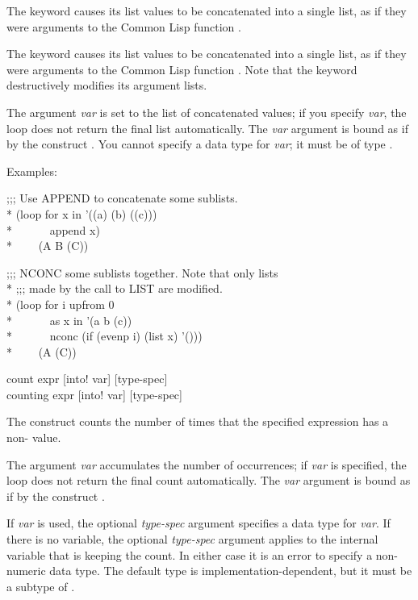\begin{new}
\begin{defloop}
The  keyword causes its list values to be concatenated 
into a single list, as if 
they were arguments to the Common Lisp function .

The  keyword causes its list values to be concatenated
into a single list,
as if they were arguments to the Common Lisp function .  
Note that the  keyword destructively modifies its argument lists.

The argument {\it var\/} is 
set to the list of concatenated values; if you specify {\it var}, the loop
does not return the final list automatically.  The {\it var\/} argument
is bound as if by the construct .
You cannot specify a data type for {\it var\/}; it must be of type .


Examples:
\begin{lisp}
;;; Use APPEND to concatenate some sublists. \\*
(loop for x in '((a) (b) ((c))) \\*
~~~~~~append x) \\*
~~~\EV~(A B (C))
\end{lisp}
\begin{lisp}
;;; NCONC some sublists together.  Note that only lists \\*
;;; made by the call to LIST are modified. \\*
(loop for i upfrom 0  \\*
~~~~~~as x in '(a b (c)) \\*
~~~~~~nconc (if (evenp i) (list x) '())) \\*
~~~\EV~(A (C))
\end{lisp}
\end{defloop}


\begin{defloop}
count expr [\!into! var] [type-spec] \\
counting expr [\!into! var] [type-spec]

The  construct counts the number of times that the specified 
expression has a non- value.

The argument {\it var\/} accumulates the number of occurrences; if 
{\it var} is specified, the loop
does not return the final count automatically.  The {\it var\/} argument
is bound as if by the construct .

If  {\it var\/} is used, the optional
{\it type-spec\/} argument specifies a data type for {\it var\/}.
If there is no  variable, the optional {\it type-spec\/}
argument applies to the internal variable that is keeping the count.
In either case it is an error to specify a non-numeric 
data type.
The default type is implementation-dependent, but it must be a subtype
of .


\end{defloop}
\end{new}
